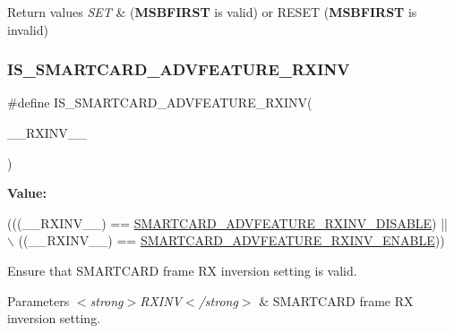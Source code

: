 \begin{DoxyRetVals}{Return values}
{\em S\+ET} & ({\bfseries M\+S\+B\+F\+I\+R\+ST} is valid) or R\+E\+S\+ET ({\bfseries M\+S\+B\+F\+I\+R\+ST} is invalid) \\
\hline
\end{DoxyRetVals}
\mbox{\label{group___s_m_a_r_t_c_a_r_d___private___macros_gadce13e55560abfa87265b6cc6360a79a}} 
\subsubsection{\texorpdfstring{I\+S\+\_\+\+S\+M\+A\+R\+T\+C\+A\+R\+D\+\_\+\+A\+D\+V\+F\+E\+A\+T\+U\+R\+E\+\_\+\+R\+X\+I\+NV}{IS\_SMARTCARD\_ADVFEATURE\_RXINV}}
{\footnotesize\ttfamily \#define I\+S\+\_\+\+S\+M\+A\+R\+T\+C\+A\+R\+D\+\_\+\+A\+D\+V\+F\+E\+A\+T\+U\+R\+E\+\_\+\+R\+X\+I\+NV(\begin{DoxyParamCaption}\item[{}]{\+\_\+\+\_\+\+R\+X\+I\+N\+V\+\_\+\+\_\+ }\end{DoxyParamCaption})}

{\bfseries Value\+:}
\begin{DoxyCode}
(((\_\_RXINV\_\_) == \hyperlink{group___s_m_a_r_t_c_a_r_d___rx___inv_ga5345fdef9cd47319b542f130c6d427c0}{SMARTCARD\_ADVFEATURE\_RXINV\_DISABLE}) || \(\backslash\)
                                                  ((\_\_RXINV\_\_) == 
      \hyperlink{group___s_m_a_r_t_c_a_r_d___rx___inv_ga6ed448100284f2373b0658fa543db9cb}{SMARTCARD\_ADVFEATURE\_RXINV\_ENABLE}))
\end{DoxyCode}


Ensure that S\+M\+A\+R\+T\+C\+A\+RD frame RX inversion setting is valid. 


\begin{DoxyParams}{Parameters}
{\em $<$strong$>$\+R\+X\+I\+N\+V$<$/strong$>$} & S\+M\+A\+R\+T\+C\+A\+RD frame RX inversion setting. \\
\hline
\end{DoxyParams}

